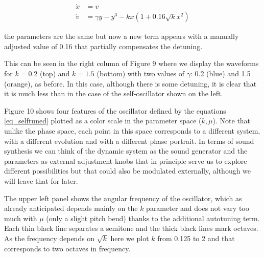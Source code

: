 \documentclass{article}
\begin{document}
\begin{subequations} \label{eq_selftuned}
\begin{align}
    \dot{x} & = v \\
    \dot{v} & = \gamma y - y^3 -kx(1+0.16\sqrt{k}x^2)
\end{align}
\end{subequations}

the parameters are the same but now a new term appears with a manually adjusted value of 0.16 that partially compensates the detuning. 

This can be seen in the right column of Figure 9 where we display the waveforms for $k=0.2$ (top) and $k=1.5$ (bottom) with two values of $\gamma$: 0.2 (blue) and 1.5 (orange), as before. 
In this case, although there is some detuning, it is clear that it is much less than in the case of the self-oscillator shown on the left.

\begin{figure}[h]
    \centering
    \caption{} 
    \label{fig_selftunedosc}
\end{figure}

Figure 10 shows four features of the oscillator defined by the equations \ref{eq_selftuned} plotted as a color scale in the parameter space ($k,\mu$). 
Note that unlike the phase space, each point in this space corresponds to a different system, with a different evolution and with a different phase portrait. 
In terms of sound synthesis we can think of the dynamic system as the sound generator and the parameters as external adjustment knobs that in principle serve us to explore different possibilities but that could also be modulated externally, although we will leave that for later.

The upper left panel shows the angular frequency of the oscillator, which as already anticipated depends mainly on the $k$ parameter and does not vary too much with $\mu$ (only a slight pitch bend) thanks to the additional autotuning term. 
Each thin black line separates a semitone and the thick black lines mark octaves. 
As the frequency depends on $\sqrt{k}$ here we plot $k$ from 0.125 to 2 and that corresponds to two octaves in frequency.
\end{document}
